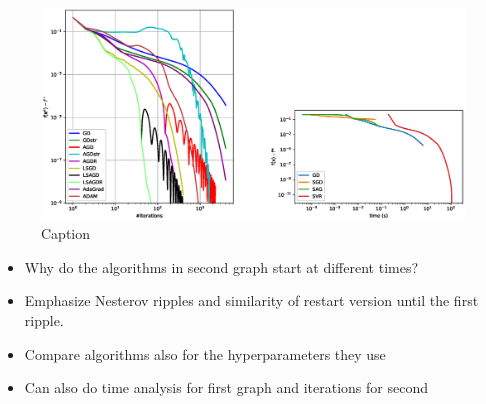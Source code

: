 \documentclass[letterpaper]{article}
\providecommand{\1}{\mathbf{1}}
\providecommand{\0}{\mathbf{0}}
\begin{document}
\begin{figure}
    \centering
    \includegraphics[scale=0.4]{Figure_1}
    \caption{Caption}
    \label{fig:my_label}
\end{figure}

\begin{itemize}
    \item Why do the algorithms in second graph start at different times?
    \item Emphasize Nesterov ripples and similarity of restart version until the first ripple.
    \item Compare algorithms also for the hyperparameters they use
    \item Can also do time analysis for first graph and iterations for second
\end{itemize}
\end{document}

